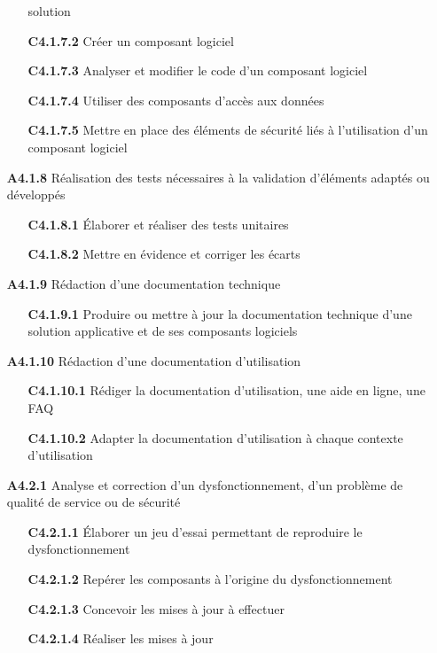 \documentclass[12pt,a4paper,oneside,titlepage,final]{article}
\begin{document}
\begin{enumerate}
\begin{itemize}
    solution
    \item [\textbf{C4.1.7.2}] Créer un composant logiciel
    \item [\textbf{C4.1.7.3}] Analyser et modifier le code d'un
    composant logiciel
    \item [\textbf{C4.1.7.4}] Utiliser des composants d'accès aux
    données
    \item [\textbf{C4.1.7.5}] Mettre en place des éléments de sécurité
    liés à l'utilisation d'un composant logiciel
  \end{itemize}
  \item [\textbf{A4.1.8}] Réalisation des tests nécessaires à la
  validation d'éléments adaptés ou développés
  \begin{itemize}
    \item [\textbf{C4.1.8.1}] Élaborer et réaliser des tests
    unitaires
    \item [\textbf{C4.1.8.2}] Mettre en évidence et corriger les
    écarts
  \end{itemize}
  \item [\textbf{A4.1.9}] Rédaction d'une documentation technique
  \begin{itemize}
    \item [\textbf{C4.1.9.1}] Produire ou mettre à jour la
    documentation technique d'une solution applicative et de ses
    composants logiciels
  \end{itemize}
  \item [\textbf{A4.1.10}] Rédaction d'une documentation d'utilisation
  \begin{itemize}
    \item [\textbf{C4.1.10.1}] Rédiger la documentation
    d'utilisation, une aide en ligne, une FAQ
    \item [\textbf{C4.1.10.2}] Adapter la documentation d'utilisation
    à chaque contexte d'utilisation
  \end{itemize}
  \item [\textbf{A4.2.1}] Analyse et correction d'un
  dysfonctionnement, d'un problème de qualité de service ou de
  sécurité
  \begin{itemize}
    \item [\textbf{C4.2.1.1}] Élaborer un jeu d'essai permettant
    de reproduire le dysfonctionnement
    \item [\textbf{C4.2.1.2}] Repérer les composants à l'origine du
    dysfonctionnement
    \item [\textbf{C4.2.1.3}] Concevoir les mises à jour à effectuer
    \item [\textbf{C4.2.1.4}] Réaliser les mises à jour

\end{itemize}
\end{enumerate}
\end{document}

